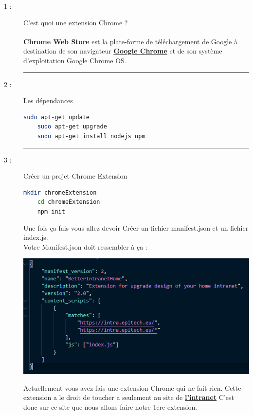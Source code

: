 \documentclass{article}
\begin{document}
    \begin{description}
        \item[1 :]{C'est quoi une extension Chrome ?} \\\\ \textbf{\href{https://chrome.google.com/webstore/category/extensions?hl=fr&authuser=0}{Chrome Web Store}} est la plate-forme de téléchargement de Google à destination de son navigateur \textbf{\href{https://www.google.com/intl/fr_fr/chrome/}{Google Chrome}} et de son système d'exploitation Google Chrome OS.
        \begin{center} 
            \rule{0.75\linewidth}{1pt}
        \end{center}
        \item[2 :]{Les dépendances}
\begin{lstlisting}[language=sh]
    sudo apt-get update
    sudo apt-get upgrade
    sudo apt-get install nodejs npm
\end{lstlisting}
        \begin{center} 
            \rule{0.75\linewidth}{1pt}
        \end{center}
        \item[3 :]{Créer un projet Chrome Extension}
\begin{lstlisting}[language=sh]
    mkdir chromeExtension
    cd chromeExtension
    npm init
\end{lstlisting}
        Une fois ça fais vous allez devoir Créer un fichier manifest.json et un fichier index.js.
        \\ Votre Manifest.json doit ressembler à ça :
        \begin{center}
            \includegraphics[scale=0.9]{../images/HowToManifest.PNG}
        \end{center}
        Actuellement vous avez fais une extension Chrome qui ne fait rien.
        Cette extension a le droit de toucher a seulement au site de \textbf{\href{https://intra.epitech.eu/}{l'intranet}} C'est donc sur ce site que nous allons faire notre 1ere extension.

\end{description}
\end{document}
